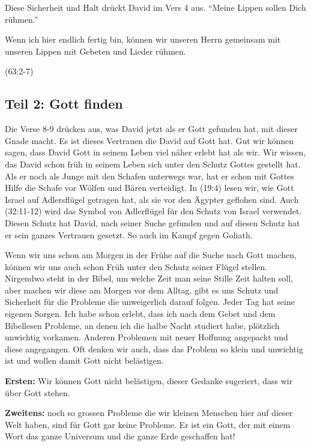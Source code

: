 \documentclass[14pt]{../../inc/mybib}
\begin{document}
    \begin{block}
        Diese Sicherheit und Halt drückt David im Vers 4 aus. \enquote{Meine Lippen sollen Dich rühmen.}

        Wenn ich hier endlich fertig bin, können wir unseren Herrn gemeinsam mit unseren Lippen mit Gebeten und Lieder rühmen.
    \end{block}
    (63:2-7)
    \subsection*{Teil 2: Gott finden}
    \begin{block}
        Die Verse 8-9 drücken aus, was David jetzt als er Gott gefunden hat, mit dieser Gnade macht. Es ist dieses Vertrauen die David auf Gott hat. Gut wir können sagen, dass David Gott in seinem Leben viel näher erlebt hat als wir. Wir wissen, das David schon früh in seinem Leben sich unter den Schutz Gottes gestellt hat. Als er noch als Junge mit den Schafen unterwegs war, hat er schon mit Gottes Hilfe die Schafe vor Wölfen und Bären verteidigt. In (19:4) lesen wir, wie Gott Israel auf Adlersflügel getragen hat, als sie vor den Ägypter geflohen sind. Auch (32:11-12) wird das Symbol von Adlerflügel für den Schutz von Israel verwendet. Diesen Schutz hat David, nach seiner Suche gefunden und auf diesen Schutz hat er sein ganzes Vertrauen gesetzt. So auch im Kampf gegen Goliath. 
    \end{block}
    \begin{block}
        Wenn wir uns schon am Morgen in der Frühe auf die Suche nach Gott machen, können wir uns auch schon Früh unter den Schutz seiner Flügel stellen. Nirgendwo steht in der Bibel, um welche Zeit man seine Stille Zeit halten soll, aber machen wir diese am Morgen vor dem Alltag, gibt es uns Schutz und Sicherheit für die Probleme die unweigerlich darauf folgen. Jeder Tag hat seine eigenen Sorgen. 
        Ich habe schon erlebt, dass ich nach dem Gebet und dem Bibellesen Probleme, an denen ich die halbe Nacht studiert habe, plötzlich unwichtig vorkamen. Anderen Problemen mit neuer Hoffnung angepackt und diese angegangen. Oft denken wir auch, dass das Problem so klein und unwichtig ist und wollen damit Gott nicht belästigen. 
        
        
        \textbf{Ersten:} Wir können Gott nicht belästigen, dieser Gedanke sugeriert, dass wir über Gott stehen. 
        
        \textbf{Zweitens:}  noch so grossen Probleme die wir kleinen Menschen hier auf dieser Welt haben, sind für Gott gar keine Probleme. Er ist ein Gott, der mit einem Wort das ganze Universum und die ganze Erde geschaffen hat!
    \end{block}
\end{document}
